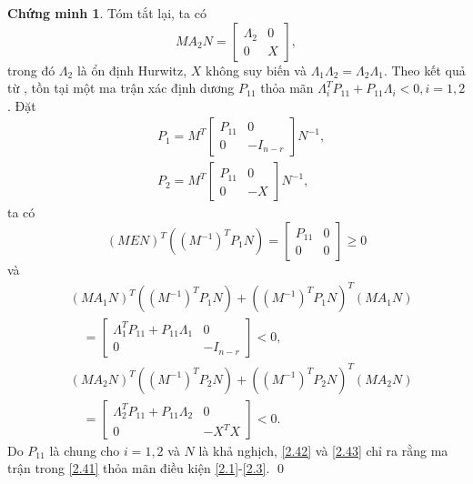 \documentclass[12pt,a4paper]{report}
\theoremstyle{definition}
\newtheorem*{cv}{Chứng minh}
\theoremstyle{definition}
\numberwithin{dl}{chapter}
\numberwithin{vd}{chapter}
\numberwithin{corollary}{chapter}
\numberwithin{lemma}{chapter}
\numberwithin{md}{chapter}
\numberwithin{dn}{chapter}
\numberwithin{cy}{chapter}
\numberwithin{nx}{chapter}
\begin{document}
\begin{cv}
Tóm tắt lại, ta có
\begin{equation}\label{2.40}
M A_{2} N=\left[\begin{array}{cc}
\Lambda_{2} & 0 \\
0 & X
\end{array}\right] ,
\end{equation}
trong đó $\Lambda_{2}$ là ổn định Hurwitz, $X$ không suy biến và $\Lambda_{1} \Lambda_{2}=\Lambda_{2} \Lambda_{1}$. Theo kết quả từ \cite{Nar94}, tồn tại một ma trận xác định dương $P_{11}$ thỏa mãn $\Lambda_{i}^{T} P_{11}+P_{11} \Lambda_{i}<0, i=1,2$. 
Đặt
\begin{equation}\label{2.41}
\begin{aligned}
&P_{1}=M^{T}\left[\begin{array}{cc}
P_{11} & 0 \\
0 & -I_{n-r}
\end{array}\right] N^{-1}, \\
&P_{2}=M^{T}\left[\begin{array}{cc}
P_{11} & 0 \\
0 & -X
\end{array}\right] N^{-1},
\end{aligned}
\end{equation}
ta có
\begin{equation}\label{2.42}
(M E N)^{T}\left(\left(M^{-1}\right)^{T} P_{1} N\right)=\left[\begin{array}{cc}
P_{11} & 0 \\
0 & 0
\end{array}\right] \geq 0 
\end{equation}
và
\begin{equation}\label{2.43}
\begin{aligned}
&\left(M A_{1} N\right)^{T}\left(\left(M^{-1}\right)^{T} P_{1} N\right) +\left(\left(M^{-1}\right)^{T} P_{1} N\right)^{T}\left(M A_{1} N\right)\\ &\quad=\left[\begin{array}{cc}
\Lambda_{1}^{T} P_{11}+P_{11} \Lambda_{1} & 0 \\
0 & -I_{n-r}
\end{array}\right]<0 ,\\
&\left(M A_{2} N\right)^{T}\left(\left(M^{-1}\right)^{T} P_{2} N\right) +\left(\left(M^{-1}\right)^{T} P_{2} N\right)^{T}\left(M A_{2} N\right)\\
&\quad=\left[\begin{array}{cc}
\Lambda_{2}^{T} P_{11}+P_{11} \Lambda_{2} & 0 \\
0 & -X^{T} X
\end{array}\right]<0 .
\end{aligned}
\end{equation}
Do $P_{11}$ là chung cho $i=1,2$ và $N$ là khả nghịch, \eqref{2.42} và \eqref{2.43} chỉ ra rằng ma trận trong \eqref{2.41} thỏa mãn điều kiện \eqref{2.1}-\eqref{2.3}.
\qed
\end{cv}
\end{document}
